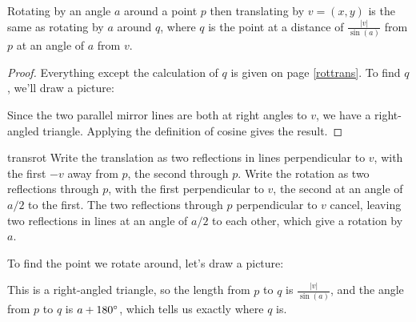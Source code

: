 \begin{theorem}
    Rotating by an angle $a$ around a point $p$ then translating by $v = (x,y)$ is the same as rotating by $a$ around $q$, where $q$ is the point at a distance of $\frac{|v|}{\sin(a)}$ from $p$ at an angle of $a$ from $v$.
\end{theorem}
\begin{proof}\label{rottranspos}
    Everything except the calculation of $q$ is given on page \ref{rottrans}. To find $q$, we'll draw a picture:
    
    
    Since the two parallel mirror lines are both at right angles to $v$, we have a right-angled triangle. Applying the definition of cosine gives the result. 
\end{proof}



\begin{invsol}{transrot}
    Write the translation as two reflections in lines perpendicular to $v$, with the first $-v$ away from $p$, the second through $p$. Write the rotation as two reflections through $p$, with the first perpendicular to $v$, the second at an angle of $a/2$ to the first. The two reflections through $p$ perpendicular to $v$ cancel, leaving two reflections in lines at an angle of $a/2$ to each other, which give a rotation by $a$. 

    To find the point we rotate around, let's draw a picture: 
    

    This is a right-angled triangle, so the length from $p$ to $q$ is $\frac{|v|}{\sin(a)}$, and the angle from $p$ to $q$ is $a + 180\degree$, which tells us exactly where $q$ is. 
\end{invsol}

